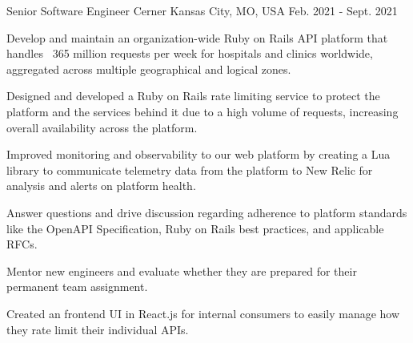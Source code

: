 \begin{cventries}
  \cventry
  {Senior Software Engineer} %
  {Cerner} %
  {Kansas City, MO, USA} %
  {Feb. 2021 - Sept. 2021} %
  {
    \begin{cvitems} %
      \item {Develop and maintain an organization-wide Ruby on Rails API platform that handles ~365 million requests per week for hospitals and clinics worldwide, aggregated across multiple geographical and logical zones.}
      \item {Designed and developed a Ruby on Rails rate limiting service to protect the platform and the services behind it due to a high volume of requests, increasing overall availability across the platform.}
      \item {Improved monitoring and observability to our web platform by creating a Lua library to communicate telemetry data from the platform to New Relic for analysis and alerts on platform health.}
      \item {Answer questions and drive discussion regarding adherence to platform standards like the OpenAPI Specification, Ruby on Rails best practices, and applicable RFCs.}
      \item {Mentor new engineers and evaluate whether they are prepared for their permanent team assignment.}
      \item {Created an frontend UI in React.js for internal consumers to easily manage how they rate limit their individual APIs.}
    \end{cvitems}
  }


\end{cventries}

